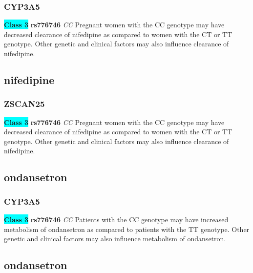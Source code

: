 \documentclass{book}
\begin{document}
\subsubsection{ CYP3A5 }

\begin{center}
\textbf{\colorbox{cyan} {Class 3}} \textbf{ rs776746 } \textit{ CC }
Pregnant women with the CC genotype may have decreased clearance of nifedipine as compared to women with the CT or TT genotype. Other genetic and clinical factors may also influence clearance of nifedipine.


\end{center}\subsection{ nifedipine }


\subsubsection{ ZSCAN25 }

\begin{center}
\textbf{\colorbox{cyan} {Class 3}} \textbf{ rs776746 } \textit{ CC }
Pregnant women with the CC genotype may have decreased clearance of nifedipine as compared to women with the CT or TT genotype. Other genetic and clinical factors may also influence clearance of nifedipine.


\end{center}\subsection{ ondansetron }


\subsubsection{ CYP3A5 }

\begin{center}
\textbf{\colorbox{cyan} {Class 3}} \textbf{ rs776746 } \textit{ CC }
Patients with the CC genotype may have increased metabolism of ondansetron as compared to patients with the TT genotype. Other genetic and clinical factors may also influence metabolism of ondansetron.


\end{center}\subsection{ ondansetron }
\end{document}
